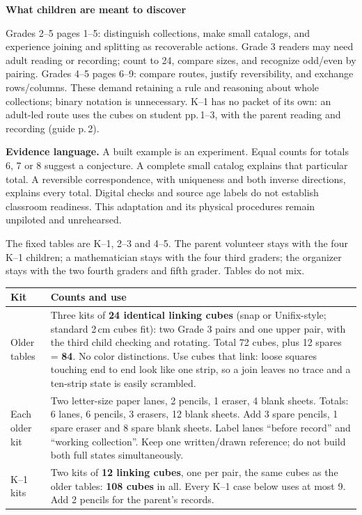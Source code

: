 \documentclass[letterpaper,11pt]{article}
\newcommand{\heading}[1]{\vspace{4pt}{\large\bfseries #1}\par}
\newcommand{\subhead}[1]{\vspace{3pt}\textbf{#1}\par}
\begin{document}
\subhead{What children are meant to discover}
Grades 2--5 pages 1--5: distinguish collections, make small catalogs, and experience joining and splitting as recoverable actions. Grade 3 readers may need adult reading or recording; count to 24, compare sizes, and recognize odd/even by pairing. Grades 4--5 pages 6--9: compare routes, justify reversibility, and exchange rows/columns. These demand retaining a rule and reasoning about whole collections; binary notation is unnecessary. K--1 has no packet of its own: an adult-led route uses the cubes on student pp.\,1--3, with the parent reading and recording (guide p.\,2).

\textbf{Evidence language.} A built example is an experiment. Equal counts for totals 6, 7 or 8 suggest a conjecture. A complete small catalog explains that particular total. A reversible correspondence, with uniqueness and both inverse directions, explains every total. Digital checks and source age labels do not establish classroom readiness. This adaptation and its physical procedures remain unpiloted and unrehearsed.
\newpage

\heading{Preparation for eleven children and three anchored adults}
The fixed tables are K--1, 2--3 and 4--5. The parent volunteer stays with the four K--1 children; a mathematician stays with the four third graders; the organizer stays with the two fourth graders and fifth grader. Tables do not mix.

\begin{tabularx}{\linewidth}{@{}L{1.23in}X@{}}\toprule
Kit & Counts and use\\\midrule
Older tables & Three kits of \textbf{24 identical linking cubes} (snap or Unifix-style; standard 2\,cm cubes fit): two Grade 3 pairs and one upper pair, with the third child checking and rotating. Total 72 cubes, plus 12 spares = \textbf{84}. No color distinctions. Use cubes that link: loose squares touching end to end look like one strip, so a join leaves no trace and a ten-strip state is easily scrambled.\\
Each older kit & Two letter-size paper lanes, 2 pencils, 1 eraser, 4 blank sheets. Totals: 6 lanes, 6 pencils, 3 erasers, 12 blank sheets. Add 3 spare pencils, 1 spare eraser and 8 spare blank sheets. Label lanes ``before record'' and ``working collection''. Keep one written/drawn reference; do not build both full states simultaneously.\\
K--1 kits & Two kits of \textbf{12 linking cubes}, one per pair, the same cubes as the older tables: \textbf{108 cubes} in all. Every K--1 case below uses at most 9. Add 2 pencils for the parent's records.\\\bottomrule
\end{tabularx}
\end{document}
